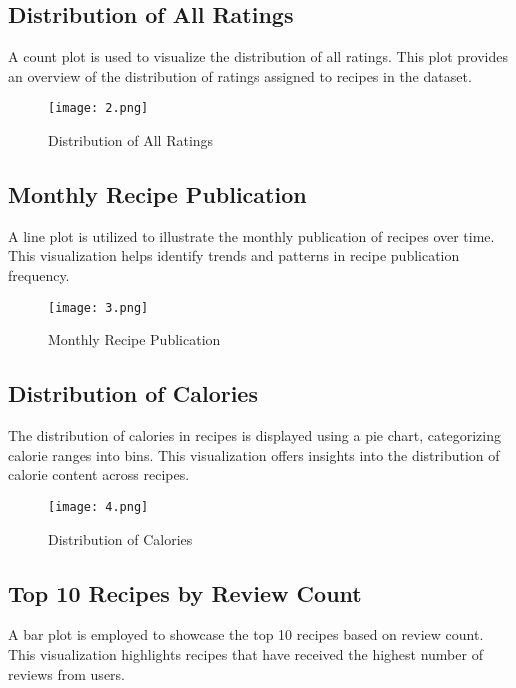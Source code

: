 \documentclass[conference]{IEEEtran}
\begin{document}
\subsection{Distribution of All Ratings}

A count plot is used to visualize the distribution of all ratings. This plot provides an overview of the distribution of ratings assigned to recipes in the dataset.

\begin{figure}[H]
\centering
\texttt{[image: 2.png]}
\caption{Distribution of All Ratings}
\label{fig:distribution_ratings}
\end{figure}


\subsection{Monthly Recipe Publication}

A line plot is utilized to illustrate the monthly publication of recipes over time. This visualization helps identify trends and patterns in recipe publication frequency.

\begin{figure}[H]
\centering
\texttt{[image: 3.png]}
\caption{Monthly Recipe Publication}
\label{fig:monthly_publication}
\end{figure}

\subsection{Distribution of Calories}

The distribution of calories in recipes is displayed using a pie chart, categorizing calorie ranges into bins. This visualization offers insights into the distribution of calorie content across recipes.

\begin{figure}[H]
\centering
\texttt{[image: 4.png]}
\caption{Distribution of Calories}
\label{fig:distribution_calories}
\end{figure}

\subsection{Top 10 Recipes by Review Count}

A bar plot is employed to showcase the top 10 recipes based on review count. This visualization highlights recipes that have received the highest number of reviews from users.
\end{document}
